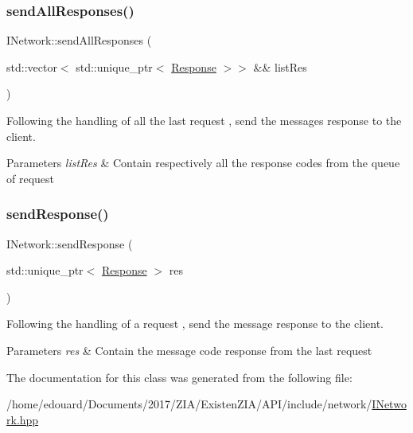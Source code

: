 \subsubsection{\texorpdfstring{send\+All\+Responses()}{sendAllResponses()}}
{\footnotesize\ttfamily I\+Network\+::send\+All\+Responses (\begin{DoxyParamCaption}\item[{std\+::vector$<$ std\+::unique\+\_\+ptr$<$ \mbox{\hyperlink{structxzia_1_1Response}{Response}} $>$$>$ \&\&}]{list\+Res }\end{DoxyParamCaption})\hspace{0.3cm}{\ttfamily [pure virtual]}}



Following the handling of all the last request , send the messages response to the client. 


\begin{DoxyParams}{Parameters}
{\em list\+Res} & Contain respectively all the response codes from the queue of request \\
\hline
\end{DoxyParams}
\mbox{\label{classxzia_1_1INetwork_a3d2089720daf1863762e53bfda6ad08c}} 
\subsubsection{\texorpdfstring{send\+Response()}{sendResponse()}}
{\footnotesize\ttfamily I\+Network\+::send\+Response (\begin{DoxyParamCaption}\item[{std\+::unique\+\_\+ptr$<$ \mbox{\hyperlink{structxzia_1_1Response}{Response}} $>$}]{res }\end{DoxyParamCaption})\hspace{0.3cm}{\ttfamily [pure virtual]}}



Following the handling of a request , send the message response to the client. 


\begin{DoxyParams}{Parameters}
{\em res} & Contain the message code response from the last request \\
\hline
\end{DoxyParams}


The documentation for this class was generated from the following file\+:\begin{DoxyCompactItemize}
\item 
/home/edouard/\+Documents/2017/\+Z\+I\+A/\+Existen\+Z\+I\+A/\+A\+P\+I/include/network/\mbox{\hyperlink{INetwork_8hpp}{I\+Network.\+hpp}}\end{DoxyCompactItemize}
